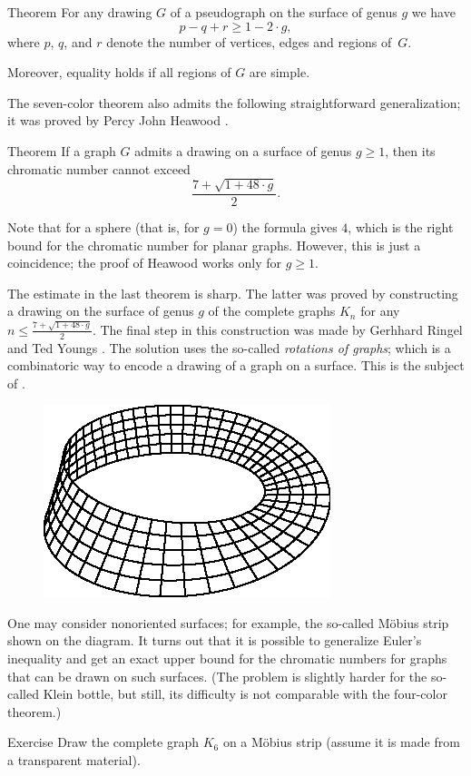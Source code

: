 \begin{thm}{Theorem}\label{thm:euler>=genus}
For any drawing $G$ of a pseudograph on the surface of genus $g$ we have
\[p-q+r\ge 1-2\cdot g,\]
where $p$, $q$, and $r$ denote the number of vertices, edges and regions of~$G$.

Moreover, equality holds if all regions of $G$ are simple.
\end{thm}

The seven-color theorem also admits the following straightforward generalization;
it was proved by Percy John Heawood \cite{heawood}.

\begin{thm}{Theorem}
If a graph $G$ admits a drawing on a surface of genus $g\ge 1$, 
then its chromatic number cannot exceed 
\[\frac{7+\sqrt{1+48\cdot g}}2.\]
\end{thm}

Note that for a sphere (that is, for $g=0$) the formula gives $4$, which is the right bound for the chromatic number for planar graphs. 
However, this is just a coincidence; the proof of Heawood works only for $g\ge 1$.

The estimate in the last theorem is sharp.
The latter was proved by constructing a drawing on the surface of genus $g$
of the complete graphs $K_n$ for any $n\le\frac{7+\sqrt{1+48\cdot g}}2$.
The final step in this construction was made by Gerhhard Ringel and Ted Youngs \cite{ringel-youngs}.
The solution uses the so-called \emph{rotations of graphs}; which is a combinatoric way to encode a drawing of a graph on a surface.
This is the subject of \cite[Chapter 10]{hartsfield-ringel}.

\begin{figure}
\vskip-0mm
\centering
\includegraphics{asy/moebius}
\vskip-0mm
\end{figure}

One may consider nonoriented surfaces; for example, the so-called Möbius strip shown on the diagram.
It turns out that it is possible to generalize Euler's inequality and get an exact upper bound for the chromatic numbers for graphs that can be drawn on such surfaces.
(The problem is slightly harder for the so-called Klein bottle, but still, its difficulty is not comparable with the four-color theorem.)

\begin{thm}{Exercise}\label{ex:K6moebius}
Draw the complete graph $K_6$ on a Möbius strip (assume it is made from a transparent material).
\end{thm}


 
